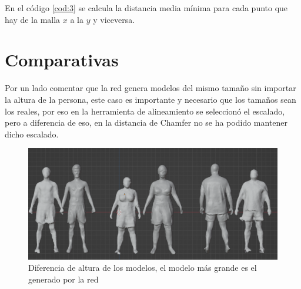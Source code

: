 En el código \ref{cod:3} se calcula la distancia media mínima para cada punto que hay de la malla $x$ a la $y$ y viceversa.
\clearpage

\section{Comparativas}

Por un lado comentar que la red genera modelos del mismo tamaño sin importar la altura de la persona, este caso es importante y necesario que los tamaños sean los reales, por eso en la herramienta de alineamiento se seleccionó el escalado, pero a diferencia de eso, en la distancia de Chamfer no se ha podido mantener dicho escalado.

\begin{figure}[H]
	\centering
	\includegraphics[scale=0.4]{imagenes/difaltura.png}
	\caption{Diferencia de altura de los modelos, el modelo más grande es el generado por la red}
	\label{fig:figura12}
\end{figure}




